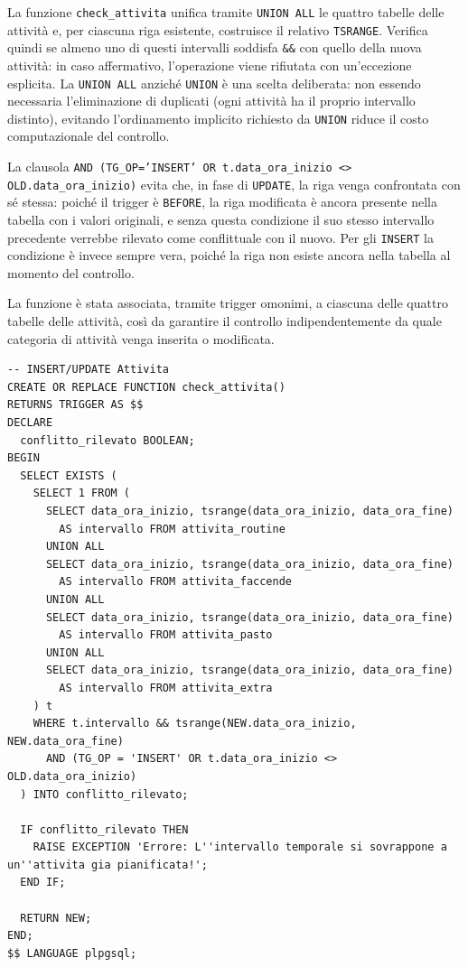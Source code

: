 \documentclass[11pt,a4paper]{article}
\begin{document}
La funzione \texttt{check\_attivita} unifica tramite \texttt{UNION ALL} le quattro tabelle delle
attività e, per ciascuna riga esistente, costruisce il relativo \texttt{TSRANGE}. Verifica
quindi se almeno uno di questi intervalli soddisfa \texttt{\&\&} con quello della nuova
attività: in caso affermativo, l'operazione viene rifiutata con un'eccezione esplicita. La
\texttt{UNION ALL} anziché \texttt{UNION} è una scelta deliberata: non essendo necessaria
l'eliminazione di duplicati (ogni attività ha il proprio intervallo distinto), evitando
l'ordinamento implicito richiesto da \texttt{UNION} riduce il costo computazionale del controllo.

La clausola \texttt{AND (TG\_OP='INSERT' OR t.data\_ora\_inizio <> OLD.data\_ora\_inizio)} evita
che, in fase di \texttt{UPDATE}, la riga venga confrontata con sé stessa: poiché il trigger è
\texttt{BEFORE}, la riga modificata è ancora presente nella tabella con i valori originali, e
senza questa condizione il suo stesso intervallo precedente verrebbe rilevato come conflittuale
con il nuovo. Per gli \texttt{INSERT} la condizione è invece sempre vera, poiché la riga non
esiste ancora nella tabella al momento del controllo.

La funzione è stata associata, tramite trigger omonimi, a ciascuna delle quattro tabelle delle
attività, così da garantire il controllo indipendentemente da quale categoria di attività venga
inserita o modificata.

\begin{verbatim}
-- INSERT/UPDATE Attivita
CREATE OR REPLACE FUNCTION check_attivita()
RETURNS TRIGGER AS $$
DECLARE
  conflitto_rilevato BOOLEAN;
BEGIN
  SELECT EXISTS (
    SELECT 1 FROM (
      SELECT data_ora_inizio, tsrange(data_ora_inizio, data_ora_fine)
        AS intervallo FROM attivita_routine
      UNION ALL
      SELECT data_ora_inizio, tsrange(data_ora_inizio, data_ora_fine)
        AS intervallo FROM attivita_faccende
      UNION ALL
      SELECT data_ora_inizio, tsrange(data_ora_inizio, data_ora_fine)
        AS intervallo FROM attivita_pasto
      UNION ALL
      SELECT data_ora_inizio, tsrange(data_ora_inizio, data_ora_fine)
        AS intervallo FROM attivita_extra
    ) t
    WHERE t.intervallo && tsrange(NEW.data_ora_inizio, NEW.data_ora_fine)
      AND (TG_OP = 'INSERT' OR t.data_ora_inizio <> OLD.data_ora_inizio)
  ) INTO conflitto_rilevato;

  IF conflitto_rilevato THEN
    RAISE EXCEPTION 'Errore: L''intervallo temporale si sovrappone a un''attivita gia pianificata!';
  END IF;

  RETURN NEW;
END;
$$ LANGUAGE plpgsql;
\end{verbatim}
\end{document}
